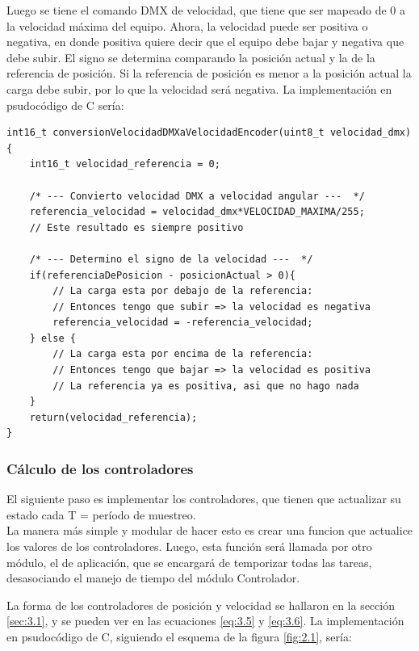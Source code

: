 Luego se tiene el comando DMX de velocidad, que tiene que ser mapeado de 0 a la velocidad máxima del equipo. Ahora, la velocidad puede ser positiva o negativa, en donde positiva quiere decir que el equipo debe bajar y negativa que debe subir. El signo se determina comparando la posición actual y la de la referencia de posición. Si la referencia de posición es menor a la posición actual la carga debe subir, por lo que la velocidad será negativa. La implementación en psudocódigo de C sería:
\begin{lstlisting}[style=CStyle]
int16_t conversionVelocidadDMXaVelocidadEncoder(uint8_t velocidad_dmx){
	int16_t velocidad_referencia = 0;
	
	/* --- Convierto velocidad DMX a velocidad angular ---  */
	referencia_velocidad = velocidad_dmx*VELOCIDAD_MAXIMA/255;
	// Este resultado es siempre positivo
	
	/* --- Determino el signo de la velocidad ---  */
	if(referenciaDePosicion - posicionActual > 0){
		// La carga esta por debajo de la referencia:
		// Entonces tengo que subir => la velocidad es negativa
		referencia_velocidad = -referencia_velocidad;
	} else {
		// La carga esta por encima de la referencia:
		// Entonces tengo que bajar => la velocidad es positiva
		// La referencia ya es positiva, asi que no hago nada 
	}
	return(velocidad_referencia);
}
\end{lstlisting}

\subsubsection{Cálculo de los controladores}
El siguiente paso es implementar los controladores, que tienen que actualizar su estado cada T = período de muestreo. \\
La manera más simple y modular de hacer esto es crear una funcion que actualice los valores de los controladores. Luego, esta función será llamada por otro módulo, el de aplicación, que se encargará de temporizar todas las tareas, desasociando el manejo de tiempo del módulo Controlador.

La forma de los controladores de posición y velocidad se hallaron en la sección \ref{sec:3.1}, y se pueden ver en las ecuaciones \ref{eq:3.5} y \ref{eq:3.6}. La implementación en psudocódigo de C, siguiendo el esquema de la figura \ref{fig:2.1}, sería:

